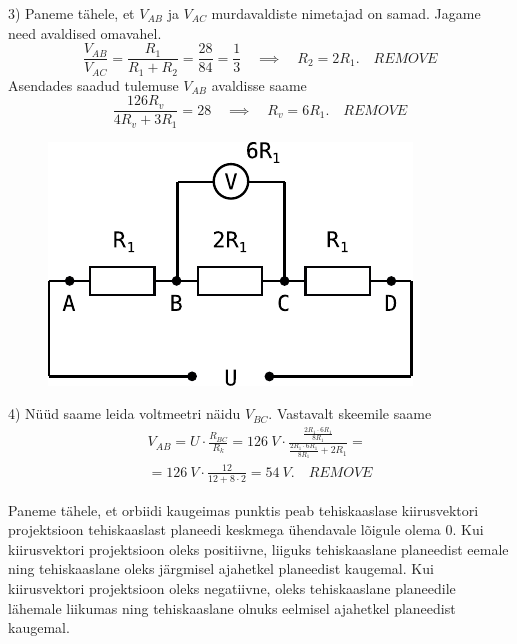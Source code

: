 \documentclass[10pt]{article}
\newcommand{\p}[1]{REMOVE}
\begin{document}
3) Paneme tähele, et $V_{AB}$ ja $V_{AC}$ murdavaldiste nimetajad on samad. Jagame need avaldised omavahel.
\[
\frac{V_{AB}}{V_{AC}}=\frac{R_1}{R_1+R_2}=\frac{28}{84}=\frac{1}{3} \quad\implies\quad R_2=2R_1. \quad \p{2}
\]
Asendades saadud tulemuse $V_{AB}$ avaldisse saame
\[
\frac{126 R_v}{4R_v+3R_1}=28\quad\implies\quad R_v=6R_1. \quad \p{2}
\]

\begin{figure}
\vspace{-2em}
  \begin{center}
    \includegraphics[width=1\linewidth]{2023-v2g-07-yl3.pdf}
  \end{center}
\vspace{-5em}
\end{figure}

4) Nüüd saame leida voltmeetri näidu $V_{BC}$. Vastavalt skeemile saame
\begin{multline*}
V_{AB}=U\cdot\frac{R_{BC}}{R_k}=\SI{126}{V}\cdot\frac{\frac{2R_1\cdot6R_1}{8R_1}}{\frac{2R_1\cdot6R_1}{8R_1}+2R_1}=\\
=\SI{126}{V}\cdot\frac{12}{12+8\cdot2}=\SI{54}{V}. \quad \p{1}
\end{multline*}
\probend
\bigskip


\solu
\par
Paneme tähele, et orbiidi kaugeimas punktis peab tehiskaaslase kiirusvektori projektsioon tehiskaaslast planeedi keskmega ühendavale lõigule olema $0$. Kui kiirusvektori projektsioon oleks positiivne, liiguks tehiskaaslane planeedist eemale ning tehiskaaslane oleks järgmisel ajahetkel planeedist kaugemal. Kui kiirusvektori projektsioon oleks negatiivne, oleks tehiskaaslane planeedile lähemale liikumas ning tehiskaaslane olnuks eelmisel ajahetkel planeedist kaugemal.
\end{document}
